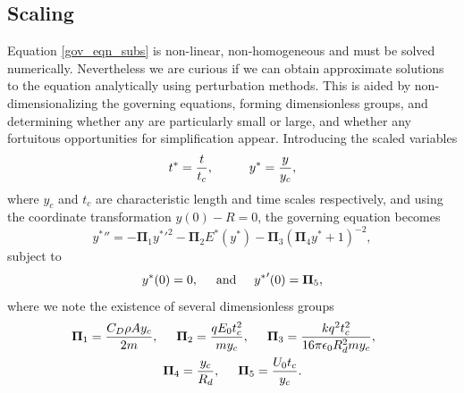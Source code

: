 \documentclass[aip,reprint, floatfix]{revtex4-1}
\begin{document}
\subsection{Scaling}
Equation \ref{gov_eqn_subs} is non-linear, non-homogeneous and must be solved numerically. Nevertheless we are curious if we can obtain approximate solutions to the equation analytically using perturbation methods. This is aided by non-dimensionalizing the governing equations, forming dimensionless groups, and determining whether any are particularly small or large, and whether any fortuitous opportunities for simplification appear. Introducing the scaled variables
\begin{equation}
 t^* = \frac{t}{t_c}, \hspace{10 mm} y^* = \frac{y}{y_c}, \end{equation}
where $y_c$ and $t_c$ are characteristic length and time scales respectively, and using the coordinate transformation $y(0) - R = 0$, the governing equation becomes
\begin{equation}
\label{pi_terms}
 {y^*}'' = - \mathbf{\Pi}_1 {y^*}'^2
- \mathbf{\Pi}_2 E^* ( {y^*} ) 
- \mathbf{\Pi}_3 \left( \mathbf{\Pi}_4 {y^*} + 1 \right)^{-2},
\end{equation}
subject to
\begin{equation*}
{y^*}(0) = 0, \hspace{5 mm} \mbox{and} \hspace{5 mm} {y^*}'(0) = \mathbf{\Pi}_5,
\end{equation*}
where we note the existence of several dimensionless groups
\begin{gather*}
\mathbf{\Pi}_1 = \frac{C_D \rho A y_c}{2 m}, \hspace{5 mm}
\mathbf{\Pi}_2 = \frac{q E_0 t_c^2}{m y_c}, \hspace{5 mm}
\mathbf{\Pi}_3 = \frac{k q^2 t_c^2}{16 \pi \epsilon_0 R_d^2 m y_c}, \hspace{5 mm}\\
\mathbf{\Pi}_4 = \frac{y_c}{R_d}, \hspace{5 mm}
\mathbf{\Pi}_5 = \frac{U_0 t_c}{y_c}.
\end{gather*}
\end{document}
